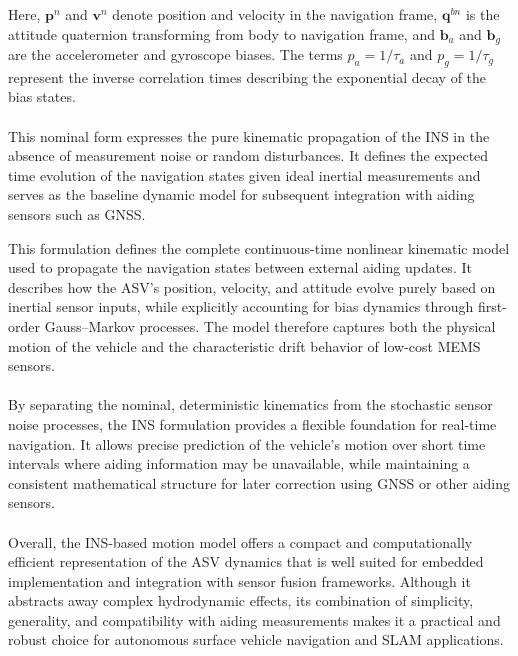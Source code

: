 Here, $\mathbf{p}^n$ and $\mathbf{v}^n$ denote position and velocity in the navigation frame, $\mathbf{q}^{bn}$ is the attitude quaternion transforming from body to navigation frame, and $\mathbf{b}_a$ and $\mathbf{b}_g$ are the accelerometer and gyroscope biases. The terms $p_a = 1/\tau_a$ and $p_g = 1/\tau_g$ represent the inverse correlation times describing the exponential decay of the bias states.  
\\ \\
This nominal form expresses the pure kinematic propagation of the INS in the absence of measurement noise or random disturbances. It defines the expected time evolution of the navigation states given ideal inertial measurements and serves as the baseline dynamic model for subsequent integration with aiding sensors such as GNSS.






This formulation defines the complete continuous-time nonlinear kinematic model used to propagate the navigation states between external aiding updates. It describes how the ASV’s position, velocity, and attitude evolve purely based on inertial sensor inputs, while explicitly accounting for bias dynamics through first-order Gauss–Markov processes. The model therefore captures both the physical motion of the vehicle and the characteristic drift behavior of low-cost MEMS sensors.  
\\ \\
By separating the nominal, deterministic kinematics from the stochastic sensor noise processes, the INS formulation provides a flexible foundation for real-time navigation. It allows precise prediction of the vehicle’s motion over short time intervals where aiding information may be unavailable, while maintaining a consistent mathematical structure for later correction using GNSS or other aiding sensors.  
\\ \\
Overall, the INS-based motion model offers a compact and computationally efficient representation of the ASV dynamics that is well suited for embedded implementation and integration with sensor fusion frameworks. Although it abstracts away complex hydrodynamic effects, its combination of simplicity, generality, and compatibility with aiding measurements makes it a practical and robust choice for autonomous surface vehicle navigation and SLAM applications.





